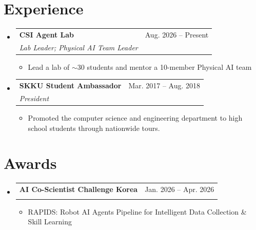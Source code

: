 \documentclass[letterpaper,11pt]{article}
\makeatletter
\newcommand{\resumeItem}[1]{
  \item\small{
    {#1 \vspace{-2pt}}
  }
}
\newcommand{\resumeSubheading}[4]{
  \vspace{-2pt}\item
    \begin{tabular*}{0.97\textwidth}[t]{l@{\extracolsep{\fill}}r}
      \textbf{#1} & #2 \\
      \textit{\small#3} & \textit{\small #4} \\
    \end{tabular*}\vspace{-7pt}
}
\newcommand{\resumeSubHeadingListStart}{\begin{itemize}[leftmargin=0.15in, label={}]}
\newcommand{\resumeSubHeadingListEnd}{\end{itemize}}
\newcommand{\resumeItemListStart}{\begin{itemize}}
\newcommand{\resumeItemListEnd}{\end{itemize}\vspace{-5pt}}
\makeatother
\begin{document}


\section{Experience}
  \resumeSubHeadingListStart
    \resumeSubheading
      {CSI Agent Lab}{Aug. 2026 -- Present}
      {Lab Leader; Physical AI Team Leader}{}
      \resumeItemListStart
        \resumeItem{Lead a lab of $\sim$30 students and mentor a 10-member Physical AI team}
      \resumeItemListEnd

        \resumeSubheading
      {SKKU Student Ambassador}{Mar. 2017 -- Aug. 2018}
      {President}{}
      \resumeItemListStart
        \resumeItem{Promoted the computer science and engineering department to high school students through nationwide tours.}
      \resumeItemListEnd


\resumeSubHeadingListEnd


\section{Awards}
    \resumeSubHeadingListStart
      \resumeSubheading
      {AI Co-Scientist Challenge Korea}{Jan. 2026 -- Apr. 2026}
      {}{}
      \resumeItemListStart
      \vspace{-4mm}
        \resumeItem{RAPIDS: Robot AI Agents Pipeline for Intelligent Data Collection \& Skill Learning}
      \resumeItemListEnd

    \resumeSubHeadingListEnd

\end{document}
